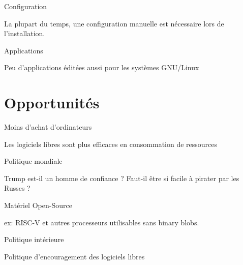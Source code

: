 \documentclass[xcolor=svgnames]{beamer}
\begin{document}
    \begin{frame}{Configuration}
    
        La plupart du temps, une configuration manuelle est nécessaire lors de l’installation.
        
    \end{frame}
    
    \begin{frame}{Applications}
    
        Peu d’applications éditées aussi pour les systèmes GNU/Linux
        
    \end{frame}
    


\section{Opportunités}

    \begin{frame}{Moins d’achat d’ordinateurs}
    
        Les logiciels libres sont plus efficaces en consommation de ressources
        
    \end{frame}
    
    \begin{frame}{Politique mondiale}
    
        Trump est-il un homme de confiance ? \pause Faut-il être si facile à pirater par les Russes ?
        
    \end{frame}
    
    \begin{frame}{Matériel Open-Source}
    
        ex: RISC-V et autres processeurs utilisables sans binary blobs.
        
    \end{frame}
    
    \begin{frame}{Politique  intérieure}
    
        Politique d’encouragement des logiciels libres
        
    \end{frame}
    
\end{document}
